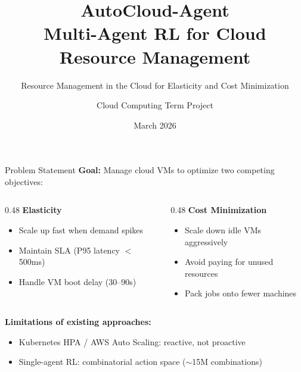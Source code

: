 \documentclass[aspectratio=169,11pt]{beamer}
\title{\textbf{AutoCloud-Agent}\\Multi-Agent RL for Cloud Resource Management}
\subtitle{Resource Management in the Cloud for Elasticity and Cost Minimization}
\author{Cloud Computing Term Project}
\institute{Indian Institute of Technology Kharagpur}
\date{March 2026}
\begin{document}
\begin{frame}
\titlepage
\end{frame}

\begin{frame}{Problem Statement}
\textbf{Goal:} Manage cloud VMs to optimize two competing objectives:

\vspace{0.3cm}
\begin{columns}[T]
\begin{column}{0.48\textwidth}
\textbf{Elasticity}
\begin{itemize}
  \item Scale up fast when demand spikes
  \item Maintain SLA (P95 latency $<$ 500ms)
  \item Handle VM boot delay (30--90s)
\end{itemize}
\end{column}
\begin{column}{0.48\textwidth}
\textbf{Cost Minimization}
\begin{itemize}
  \item Scale down idle VMs aggressively
  \item Avoid paying for unused resources
  \item Pack jobs onto fewer machines
\end{itemize}
\end{column}
\end{columns}

\vspace{0.5cm}
\textbf{Limitations of existing approaches:}
\begin{itemize}
  \item Kubernetes HPA / AWS Auto Scaling: reactive, not proactive
  \item Single-agent RL: combinatorial action space ($\sim$15M combinations)
\end{itemize}
\end{frame}
\end{document}
